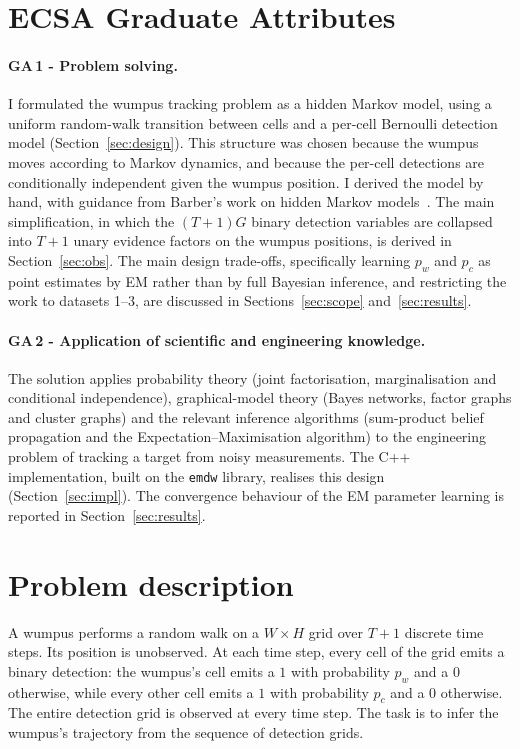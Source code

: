 \documentclass[11pt, a4paper]{article}
\begin{document}
\section*{ECSA Graduate Attributes}

\paragraph{GA\,1 - Problem solving.}
I formulated the wumpus tracking problem as a hidden Markov model, using a
uniform random-walk transition between cells and a per-cell Bernoulli
detection model (Section~\ref{sec:design}). This structure was chosen because
the wumpus moves according to Markov dynamics, and because the per-cell
detections are conditionally independent given the wumpus position. I derived
the model by hand, with guidance from Barber's work on hidden Markov
models~\cite[Ch.~23]{barber2012bayesian}. The main simplification, in which
the $(T{+}1)G$ binary detection variables are collapsed into $T{+}1$ unary
evidence factors on the wumpus positions, is derived in
Section~\ref{sec:obs}. The main design trade-offs, specifically learning
$p_w$ and $p_c$ as point estimates by EM rather than by full Bayesian inference,
and restricting the work to
datasets 1--3, are discussed in Sections~\ref{sec:scope}
and~\ref{sec:results}.

\paragraph{GA\,2 - Application of scientific and engineering knowledge.}
The solution applies probability theory (joint factorisation, marginalisation
and conditional independence), graphical-model theory (Bayes networks, factor
graphs and cluster graphs) and the relevant inference algorithms (sum-product
belief propagation and the Expectation--Maximisation algorithm) to the
engineering problem of tracking a target from noisy measurements. The C++
implementation, built on the \texttt{emdw} library, realises this design
(Section~\ref{sec:impl}). The convergence behaviour of the EM parameter learning is
reported in Section~\ref{sec:results}.

\section{Problem description} 

A wumpus performs a random walk on a $W \times H$ grid over $T{+}1$ discrete
time steps. Its position is unobserved. At each time step, every cell of the grid
emits a binary detection: the wumpus's cell emits a $1$ with
probability $p_w$  and a $0$ otherwise, while every
other cell emits a $1$ with probability $p_c$ and a
$0$ otherwise. The entire detection grid is observed at every time step. The
task is to infer the wumpus's trajectory from the sequence of detection grids.
\end{document}
